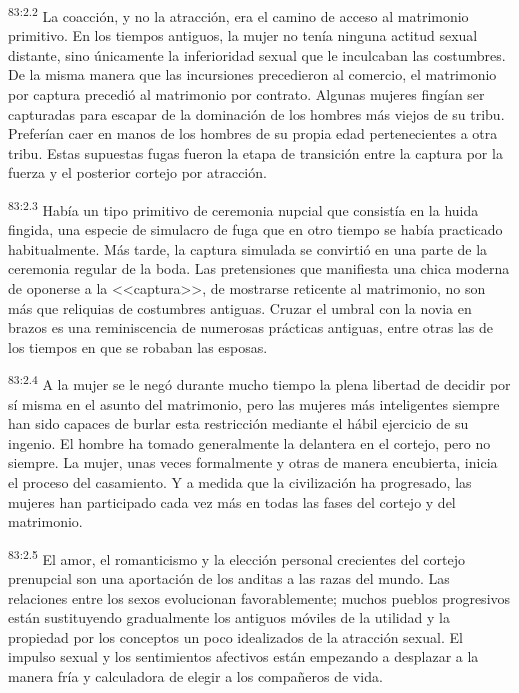 \par
\textsuperscript{83:2.2} La coacción, y no la atracción, era el camino de acceso al matrimonio primitivo. En los tiempos antiguos, la mujer no tenía ninguna actitud sexual distante, sino únicamente la inferioridad sexual que le inculcaban las costumbres. De la misma manera que las incursiones precedieron al comercio, el matrimonio por captura precedió al matrimonio por contrato. Algunas mujeres fingían ser capturadas para escapar de la dominación de los hombres más viejos de su tribu. Preferían caer en manos de los hombres de su propia edad pertenecientes a otra tribu. Estas supuestas fugas fueron la etapa de transición entre la captura por la fuerza y el posterior cortejo por atracción.

\par
\textsuperscript{83:2.3} Había un tipo primitivo de ceremonia nupcial que consistía en la huida fingida, una especie de simulacro de fuga que en otro tiempo se había practicado habitualmente. Más tarde, la captura simulada se convirtió en una parte de la ceremonia regular de la boda. Las pretensiones que manifiesta una chica moderna de oponerse a la <<captura>>, de mostrarse reticente al matrimonio, no son más que reliquias de costumbres antiguas. Cruzar el umbral con la novia en brazos es una reminiscencia de numerosas prácticas antiguas, entre otras las de los tiempos en que se robaban las esposas.

\par
\textsuperscript{83:2.4} A la mujer se le negó durante mucho tiempo la plena libertad de decidir por sí misma en el asunto del matrimonio, pero las mujeres más inteligentes siempre han sido capaces de burlar esta restricción mediante el hábil ejercicio de su ingenio. El hombre ha tomado generalmente la delantera en el cortejo, pero no siempre. La mujer, unas veces formalmente y otras de manera encubierta, inicia el proceso del casamiento. Y a medida que la civilización ha progresado, las mujeres han participado cada vez más en todas las fases del cortejo y del matrimonio.

\par
\textsuperscript{83:2.5} El amor, el romanticismo y la elección personal crecientes del cortejo prenupcial son una aportación de los anditas a las razas del mundo. Las relaciones entre los sexos evolucionan favorablemente; muchos pueblos progresivos están sustituyendo gradualmente los antiguos móviles de la utilidad y la propiedad por los conceptos un poco idealizados de la atracción sexual. El impulso sexual y los sentimientos afectivos están empezando a desplazar a la manera fría y calculadora de elegir a los compañeros de vida.

